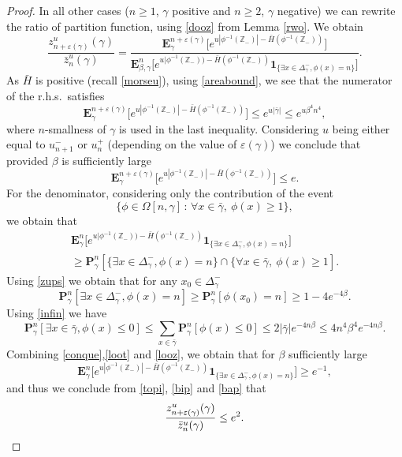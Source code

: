\documentclass[10pt]{amsart}
\newcommand{\sep}{\,:\,}
\numberwithin{equation}{section}
\theoremstyle{plain}
\theoremstyle{definition}
\newcommand{\ind}{\mathbf{1}}
\newcommand{\bP}{{\ensuremath{\mathbf P}} }
\newcommand{\bE}{{\ensuremath{\mathbf E}} }
\newcommand{\bbZ}{{\ensuremath{\mathbb Z}} }
\newcommand{\gb}{\beta}
\newcommand{\gep}{\varepsilon}
\newcommand{\gO}{\Omega}
\begin{document}
\begin{proof}
In all other cases ($n\ge 1$, $\gamma$ positive and $n\ge 2$, $\gamma$ negative)
we can rewrite the ratio of partition function, using \eqref{dooz} from Lemma \ref{rwo}. We obtain
\begin{equation}\label{topi}
\frac{z^u_{n+\gep(\gamma)}(\gamma)}{ \bar z^u_n(\gamma)}
= \frac{ \bE^{n+\gep(\gamma)}_{\gamma}\bigl[e^{u |\phi^{-1} (\bbZ_-)| -\bar H(\phi^{-1}(\bbZ_-))}\bigr]}{\bE^n_{\gb,\gamma}\bigl[e^{u |\phi^{-1}(\bbZ_-))-\bar H(\phi^{-1}(\bbZ_-))}\ind_{\{ \exists x\in \Delta^-_{\gamma},\phi(x)=n\}}\bigr]}.
\end{equation}
As $\bar H$ is positive (recall \eqref{morseu}), using \eqref{areabound}, we see that the numerator of the r.h.s.\ satisfies
\begin{equation*}%
\bE^{n+\gep(\gamma)}_{\gamma}\bigl[e^{u |\phi^{-1} (\bbZ_-)| -\bar H(\phi^{-1}(\bbZ_-))}\bigr] \le e^{u|\bar \gamma|}\le e^{u \gb^4n^4},
\end{equation*}
where $n$-smallness of $\gamma$ is used in the last inequality.
Considering $u$ being either equal to $u^-_{n+1}$ or $u^+_n$ (depending on the value of $\gep(\gamma)$) we conclude that provided $\gb$ is sufficiently large
\begin{equation}\label{bip}
\bE^{n+\gep(\gamma)}_{\gamma}\bigl[e^{u |\phi^{-1} (\bbZ_-)| -\bar H(\phi^{-1}(\bbZ_-))}\bigr]\le e.
\end{equation}
For the denominator,
considering only the contribution of the event
\[
\{\phi \in \gO[n,\gamma] \sep \forall x\in \bar \gamma,\ \phi(x)\ge 1\},
\]
we obtain that
\begin{multline}\label{conque}
\bE^n_{\gamma}\bigl[e^{u |\phi^{-1}(\bbZ_-))-\bar H(\phi^{-1}(\bbZ_-))}\ind_{\{\exists x\in \Delta^-_{\gamma},\phi(x)=n\}}\bigr]\\
\ge
\bP^n_{\gamma}\left[\{\exists x\in \Delta^-_{\gamma},\phi(x)=n\}\cap \{\forall x\in \bar \gamma,\ \phi(x)\ge 1 \right].
\end{multline}
Using \eqref{zups} we obtain that for any $x_0\in \Delta^-_{\gamma}$
\begin{equation}\label{loot}
\bP^n_{\gamma}\left[\exists x\in \Delta^-_{\gamma},\phi(x)=n \right]\ge \bP^n_{\gamma}\left[\phi(x_0)=n\right]\ge 1-4e^{-4\gb}.
\end{equation}
Using \eqref{infin} we have
\begin{equation}\label{looz}
\bP^n_{\gamma} \left[ \exists x\in \bar \gamma, \phi(x)\le 0 \right]
\le \sum_{x\in \bar \gamma} \bP^n_{\gamma} [ \phi(x)\le 0]\le 2|\bar \gamma| e^{-4n\gb}\le 4n^4\gb^4 e^{-4n\gb}.
\end{equation}
Combining \eqref{conque},\eqref{loot} and \eqref{looz}, we obtain that for $\gb$ sufficiently large
\begin{equation}\label{bap}
\bE^n_{\gamma}\bigl[e^{u |\phi^{-1}(\bbZ_-)|-\bar H(\phi^{-1}(\bbZ_-))}\ind_{\{\exists x\in \Delta^-_{\gamma},\phi(x)=n\}}\bigr]\ge e^{-1},
\end{equation}
and thus we conclude from \eqref{topi}, \eqref{bip} and \eqref{bap} that
\[
\frac{z^u_{n+\gep(\gamma)}(\gamma)}{\bar z^u_n(\gamma)}\le e^2.\qedhere
\]
\end{proof}
\end{document}
